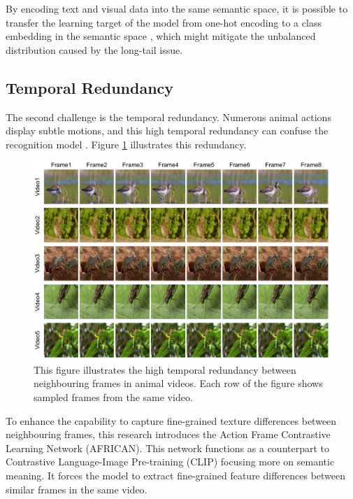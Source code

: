By encoding text and visual data into the same semantic space, it is possible to transfer the learning target of the model from one-hot encoding to a class embedding in the semantic space \parencite{ma2022x}, which might mitigate the unbalanced distribution caused by the long-tail issue. 


\subsection{Temporal Redundancy}
The second challenge is the temporal redundancy. Numerous animal actions display subtle motions, and this high temporal redundancy can confuse the recognition model \parencite{YUAN2018221, li2022uniformer}. Figure \ref{fig:1_3_FrameComparison} illustrates this redundancy. 

\begin{figure}[ht]
    \centering
    \includegraphics[width=1\textwidth]{assets/charts/1_3_FrameComparison}
    \caption[Temporal Redundancy]{This figure illustrates the high temporal redundancy between neighbouring frames in animal videos. Each row of the figure shows sampled frames from the same video.}
    \label{fig:1_3_FrameComparison}
\end{figure}

To enhance the capability to capture fine-grained texture differences between neighbouring frames, this research introduces the Action Frame Contrastive Learning Network (AFRICAN). This network functions as a counterpart to Contrastive Language-Image Pre-training (CLIP) \parencite{radford2021learning} focusing more on semantic meaning. It forces the model to extract fine-grained feature differences between similar frames in the same video. 

